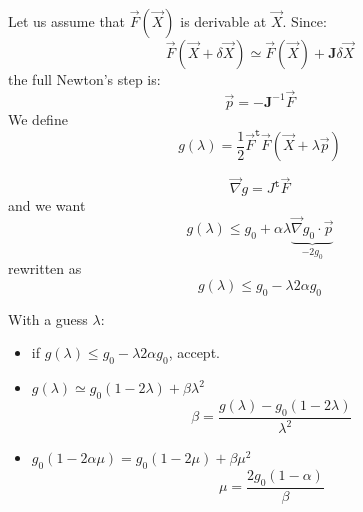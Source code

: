 \documentclass[aps,12pt]{revtex4}
\newcommand{\trn}[1]{{#1}^{\mathtt{t}}}
\begin{document}
Let us assume that $\vec{F}(\vec{X})$ is derivable at $\vec{X}$.
Since:
\begin{equation}
	\vec{F}(\vec{X}+\delta\vec{X}) \simeq \vec{F}(\vec{X}) + \bm{J} \delta\vec{X}
\end{equation}
the full Newton's step is:
\begin{equation}
	\vec{p} = - \bm{J}^{-1} \vec{F}
\end{equation}
We define
\begin{equation}
	g(\lambda) = \dfrac{1}{2} \trn{\vec{F}}  \vec{F} (\vec{X}+\lambda \vec{p})
\end{equation}

\begin{equation}
	\vec{\nabla}g = \trn{J}\vec{F}
\end{equation}
and we want
\begin{equation}
	g(\lambda) \leq g_0 + \alpha \lambda \underbrace{\vec{\nabla}g_0 \cdot \vec{p}}_{-2g_0}
\end{equation}
rewritten as
\begin{equation}
	g(\lambda) \leq g_0 -\lambda 2 \alpha g_0
\end{equation}

With a guess $\lambda$:
\begin{itemize}
\item if $g(\lambda) \leq g_0 - \lambda 2 \alpha g_0$, accept.
\item $g(\lambda)\simeq g_0 (1- 2\lambda) + \beta \lambda^2$
$$\beta = \dfrac{g(\lambda)-g_0(1-2\lambda)}{\lambda^2}$$
\item $g_0 (1-2\alpha\mu)  =  g_0 (1- 2\mu) + \beta \mu^2$
$$
	\mu = \dfrac{2g_0(1-\alpha)}{\beta}
$$
\end{itemize}
\end{document}
